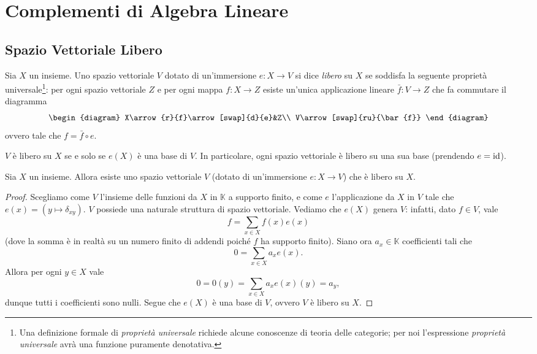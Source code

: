 \chapter{Complementi di Algebra Lineare}

\section{Spazio Vettoriale Libero}

\begin{definition}
Sia $X$ un insieme. Uno spazio vettoriale $V$ dotato di un'immersione $e:X\to V$ si dice \emph{libero} su $X$ se soddisfa la seguente proprietà universale\footnote{Una definizione formale di \emph{proprietà universale} richiede alcune conoscenze di teoria delle categorie; per noi l'espressione \emph{proprietà universale} avrà una funzione puramente denotativa.}: per ogni spazio vettoriale $Z$ e per ogni mappa $f:X\to Z$ esiste un'unica applicazione lineare $\bar{f}:V\to Z$ che fa commutare il diagramma
$$
\begin{diagram}
X\arrow{r}{f}\arrow[swap]{d}{e}&Z\\
V\arrow[swap]{ru}{\bar{f}}
\end{diagram}
$$
ovvero tale che $f=\bar{f}\circ e$.
\end{definition}

\begin{remark}
$V$ è libero su $X$ se e solo se $e(X)$ è una base di $V$. In particolare, ogni spazio vettoriale è libero su una sua base (prendendo $e=\operatorname{id}$).
\end{remark}

\begin{proposition}
Sia $X$ un insieme. Allora esiste uno spazio vettoriale $V$ (dotato di un'immersione $e:X\to V$) che è libero su $X$.
\end{proposition}
\begin{proof}
Scegliamo come $V$ l'insieme delle funzioni da $X$ in $\mathbb{K}$ a supporto finito, e come $e$ l'applicazione da $X$ in $V$ tale che $e(x)=(y\mapsto\delta_{xy})$. $V$ possiede una naturale struttura di spazio vettoriale. Vediamo che $e(X)$ genera $V$: infatti, dato $f\in V$, vale
$$
f=\sum_{x\in X}f(x)e(x)
$$
(dove la somma è in realtà su un numero finito di addendi poiché $f$ ha supporto finito). Siano ora $a_x\in\mathbb{K}$ coefficienti tali che
$$
0=\sum_{x\in X}a_xe(x).
$$
Allora per ogni $y\in X$ vale
$$
0=0(y)=\sum_{x\in X}a_xe(x)(y)=a_y,
$$
dunque tutti i coefficienti sono nulli. Segue che $e(X)$ è una base di $V$, ovvero $V$ è libero su $X$.
\end{proof}

